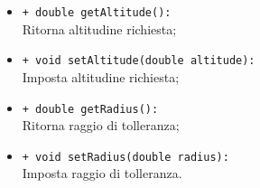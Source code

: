 \begin{flushleft}
\begin{itemize}
\begin{sloppypar}
\begin{itemize}
\item \texttt{+ double getAltitude():}\\ Ritorna altitudine richiesta;
\item \texttt{+ void setAltitude(double altitude):}\\ Imposta altitudine richiesta;
\item \texttt{+ double getRadius():}\\ Ritorna raggio di tolleranza;
\item \texttt{+ void setRadius(double radius):}\\ Imposta raggio di tolleranza.
\end{itemize}
\end{sloppypar}
\end{itemize}
\end{flushleft}

